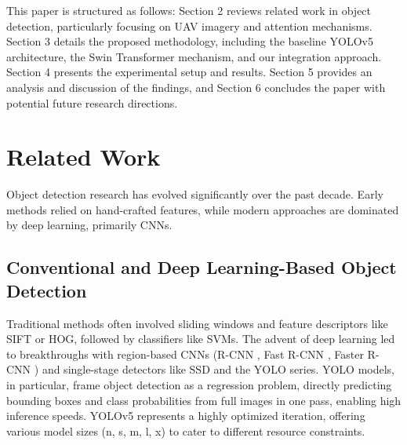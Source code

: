 \documentclass[conference]{IEEEtran}
\begin{document}
This paper is structured as follows: Section 2 reviews related work in object detection, particularly focusing on UAV imagery and attention mechanisms. Section 3 details the proposed methodology, including the baseline YOLOv5 architecture, the Swin Transformer mechanism, and our integration approach. Section 4 presents the experimental setup and results. Section 5 provides an analysis and discussion of the findings, and Section 6 concludes the paper with potential future research directions.

\section{Related Work}
Object detection research has evolved significantly over the past decade. Early methods relied on hand-crafted features, while modern approaches are dominated by deep learning, primarily CNNs.
\subsection{Conventional and Deep Learning-Based Object Detection}
Traditional methods often involved sliding windows and feature descriptors like SIFT or HOG, followed by classifiers like SVMs. The advent of deep learning led to breakthroughs with region-based CNNs (R-CNN \cite{girshick2014rich}, Fast R-CNN \cite{girshick2015fast}, Faster R-CNN \cite{ren2015faster}) and single-stage detectors like SSD \cite{liu2016ssd} and the YOLO series. YOLO models, in particular, frame object detection as a regression problem, directly predicting bounding boxes and class probabilities from full images in one pass, enabling high inference speeds. YOLOv5 represents a highly optimized iteration, offering various model sizes (n, s, m, l, x) to cater to different resource constraints.
\end{document}
